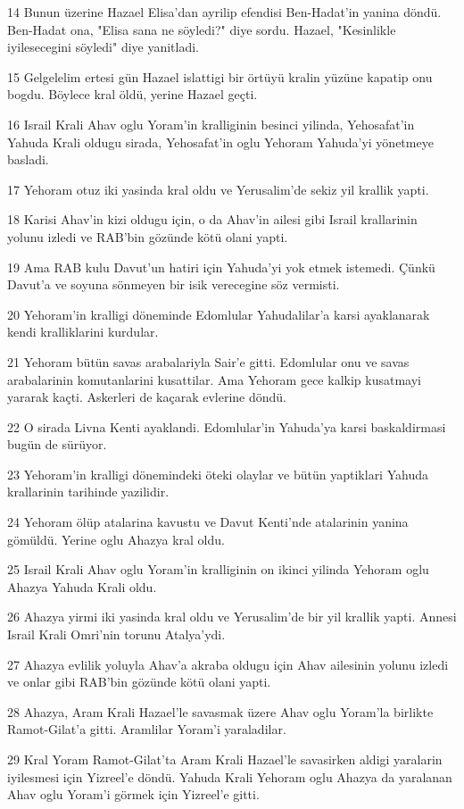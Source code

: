 \par 14 Bunun üzerine Hazael Elisa'dan ayrilip efendisi Ben-Hadat'in yanina döndü. Ben-Hadat ona, "Elisa sana ne söyledi?" diye sordu. Hazael, "Kesinlikle iyilesecegini söyledi" diye yanitladi.
\par 15 Gelgelelim ertesi gün Hazael islattigi bir örtüyü kralin yüzüne kapatip onu bogdu. Böylece kral öldü, yerine Hazael geçti.
\par 16 Israil Krali Ahav oglu Yoram'in kralliginin besinci yilinda, Yehosafat'in Yahuda Krali oldugu sirada, Yehosafat'in oglu Yehoram Yahuda'yi yönetmeye basladi.
\par 17 Yehoram otuz iki yasinda kral oldu ve Yerusalim'de sekiz yil krallik yapti.
\par 18 Karisi Ahav'in kizi oldugu için, o da Ahav'in ailesi gibi Israil krallarinin yolunu izledi ve RAB'bin gözünde kötü olani yapti.
\par 19 Ama RAB kulu Davut'un hatiri için Yahuda'yi yok etmek istemedi. Çünkü Davut'a ve soyuna sönmeyen bir isik verecegine söz vermisti.
\par 20 Yehoram'in kralligi döneminde Edomlular Yahudalilar'a karsi ayaklanarak kendi kralliklarini kurdular.
\par 21 Yehoram bütün savas arabalariyla Sair'e gitti. Edomlular onu ve savas arabalarinin komutanlarini kusattilar. Ama Yehoram gece kalkip kusatmayi yararak kaçti. Askerleri de kaçarak evlerine döndü.
\par 22 O sirada Livna Kenti ayaklandi. Edomlular'in Yahuda'ya karsi baskaldirmasi bugün de sürüyor.
\par 23 Yehoram'in kralligi dönemindeki öteki olaylar ve bütün yaptiklari Yahuda krallarinin tarihinde yazilidir.
\par 24 Yehoram ölüp atalarina kavustu ve Davut Kenti'nde atalarinin yanina gömüldü. Yerine oglu Ahazya kral oldu.
\par 25 Israil Krali Ahav oglu Yoram'in kralliginin on ikinci yilinda Yehoram oglu Ahazya Yahuda Krali oldu.
\par 26 Ahazya yirmi iki yasinda kral oldu ve Yerusalim'de bir yil krallik yapti. Annesi Israil Krali Omri'nin torunu Atalya'ydi.
\par 27 Ahazya evlilik yoluyla Ahav'a akraba oldugu için Ahav ailesinin yolunu izledi ve onlar gibi RAB'bin gözünde kötü olani yapti.
\par 28 Ahazya, Aram Krali Hazael'le savasmak üzere Ahav oglu Yoram'la birlikte Ramot-Gilat'a gitti. Aramlilar Yoram'i yaraladilar.
\par 29 Kral Yoram Ramot-Gilat'ta Aram Krali Hazael'le savasirken aldigi yaralarin iyilesmesi için Yizreel'e döndü. Yahuda Krali Yehoram oglu Ahazya da yaralanan Ahav oglu Yoram'i görmek için Yizreel'e gitti.

